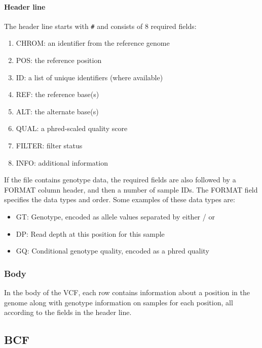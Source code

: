 \documentclass[11pt]{article}
\providecommand{\tightlist}{%
      \setlength{\itemsep}{0pt}\setlength{\parskip}{0pt}}
\begin{document}
\hypertarget{header-line}{%
\paragraph{Header line}\label{header-line}}

The header line starts with \texttt{\#} and consists of 8 required
fields:

\begin{enumerate}
\def\labelenumi{\arabic{enumi}.}
\tightlist
\item
  CHROM: an identifier from the reference genome
\item
  POS: the reference position
\item
  ID: a list of unique identifiers (where available)
\item
  REF: the reference base(s)
\item
  ALT: the alternate base(s)
\item
  QUAL: a phred-scaled quality score
\item
  FILTER: filter status
\item
  INFO: additional information
\end{enumerate}

If the file contains genotype data, the required fields are also
followed by a FORMAT column header, and then a number of sample IDs. The
FORMAT field specifies the data types and order. Some examples of these
data types are:

\begin{itemize}
\tightlist
\item
  GT: Genotype, encoded as allele values separated by either / or
  \textbar{}
\item
  DP: Read depth at this position for this sample
\item
  GQ: Conditional genotype quality, encoded as a phred quality
\end{itemize}

\hypertarget{body}{%
\subsubsection{Body}\label{body}}

In the body of the VCF, each row contains information about a position
in the genome along with genotype information on samples for each
position, all according to the fields in the header line.

\hypertarget{bcf}{%
\subsection{BCF}\label{bcf}}
\end{document}
